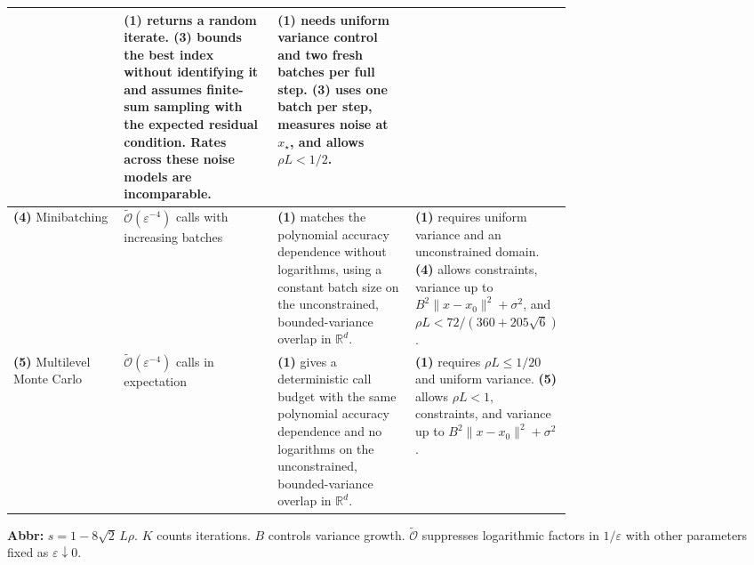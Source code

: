 \begin{table}[tp]
\begin{threeparttable}
\begin{tabularx}{\linewidth}{@{}>{\raggedright\arraybackslash}p{0.20\linewidth}>{\raggedright\arraybackslash}p{0.28\linewidth}>{\raggedright\arraybackslash}p{0.25\linewidth}>{\raggedright\arraybackslash}X@{}}
& \textbf{(1)} returns a random iterate. \textbf{(3)} bounds the best index without identifying it and assumes finite-sum sampling with the expected residual condition. Rates across these noise models are incomparable.
& \textbf{(1)} needs uniform variance control and two fresh batches per full step. \textbf{(3)} uses one batch per step, measures noise at $x_\star$, and allows $\rho L<1/2$. \\
\midrule
\textbf{(4)} Minibatching \citep[Thm.~2.1]{swmAK2026v1}
& $\widetilde{\mathcal{O}}(\varepsilon^{-4})$ calls with increasing batches
& \textbf{(1)} matches the polynomial accuracy dependence without logarithms, using a constant batch size on the unconstrained, bounded-variance overlap in $\mathbb R^d$.
& \textbf{(1)} requires uniform variance and an unconstrained domain. \textbf{(4)} allows constraints, variance up to $B^2\|x-x_0\|^2+\sigma^2$, and $\rho L<72/(360+205\sqrt6)$. \\
\midrule
\textbf{(5)} Multilevel Monte Carlo \citep[Thm.~3.1]{swmAK2026v1}
& $\widetilde{\mathcal{O}}(\varepsilon^{-4})$ calls in expectation
& \textbf{(1)} gives a deterministic call budget with the same polynomial accuracy dependence and no logarithms on the unconstrained, bounded-variance overlap in $\mathbb R^d$.
& \textbf{(1)} requires $\rho L\le1/20$ and uniform variance. \textbf{(5)} allows $\rho L<1$, constraints, and variance up to $B^2\|x-x_0\|^2+\sigma^2$. \\
\bottomrule
\end{tabularx}
\begin{tablenotes}[flushleft]\footnotesize
\item[] \textbf{Abbr:} $s=1-8\sqrt2\,L\rho$. $K$ counts iterations. $B$ controls variance growth. $\widetilde{\mathcal{O}}$ suppresses logarithmic factors in $1/\varepsilon$ with other parameters fixed as $\varepsilon\downarrow0$.
\end{tablenotes}
\end{threeparttable}
\end{table}
